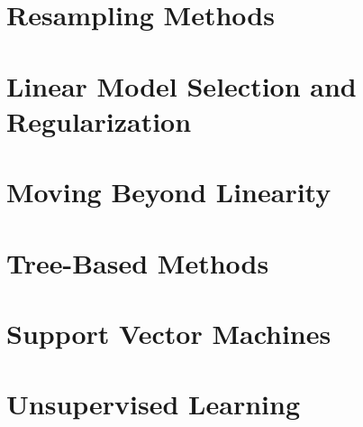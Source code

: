 \documentclass[a4paper,12pt,titlepage]{article} %
\begin{document}
\newpage
\section{Resampling Methods}


\newpage
\section{Linear Model Selection and Regularization}


\newpage
\section{Moving Beyond Linearity}


\newpage
\section{Tree-Based Methods}


\newpage
\section{Support Vector Machines}


\newpage
\section{Unsupervised Learning}


\newpage
\listoftables

\newpage
\listoffigures

\end{document}
